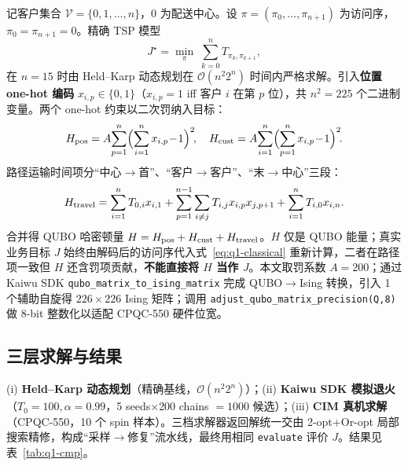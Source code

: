 \documentclass[UTF8,12pt,a4paper]{ctexart}
\begin{document}
记客户集合 $\mathcal{V}=\{0,1,\dots,n\}$，0 为配送中心。设 $\pi=(\pi_0,\dots,\pi_{n+1})$ 为访问序，$\pi_0=\pi_{n+1}=0$。精确 TSP 模型
\begin{equation}
\label{eq:q1-classical}
J^{\star} = \min_{\pi}\; \sum_{k=0}^{n} T_{\pi_k,\pi_{k+1}},
\end{equation}
在 $n=15$ 时由 Held--Karp 动态规划在 $\mathcal{O}(n^{2}2^{n})$ 时间内严格求解。引入\textbf{位置 one-hot 编码} $x_{i,p}\!\in\!\{0,1\}$（$x_{i,p}=1$ iff 客户 $i$ 在第 $p$ 位），共 $n^{2}=225$ 个二进制变量\cite{lucas2014ising,glover2019qubo,warren2017tspqubo}。两个 one-hot 约束以二次罚纳入目标：
\begin{equation}
H_{\rm pos}=A\!\sum_{p=1}^{n}\!\Big(\!\sum_{i=1}^{n} x_{i,p}\!-\!1\Big)^{2}\!,\quad
H_{\rm cust}=A\!\sum_{i=1}^{n}\!\Big(\!\sum_{p=1}^{n} x_{i,p}\!-\!1\Big)^{2}\!.
\label{eq:q1-pos}
\end{equation}
路径运输时间项分``中心$\to$首''、``客户$\to$客户''、``末$\to$中心''三段：
\begin{equation}
\label{eq:q1-travel}
H_{\rm travel}
= \sum_{i=1}^{n} T_{0,i}x_{i,1}
+ \sum_{p=1}^{n-1}\sum_{i\ne j} T_{i,j}x_{i,p}x_{j,p+1}
+ \sum_{i=1}^{n} T_{i,0}x_{i,n}.
\end{equation}
合并得 QUBO 哈密顿量 $H=H_{\rm pos}+H_{\rm cust}+H_{\rm travel}$。$H$ 仅是 QUBO 能量；真实业务目标 $J$ 始终由解码后的访问序代入式~\eqref{eq:q1-classical} 重新计算，二者在路径项一致但 $H$ 还含罚项贡献，\textbf{不能直接将 $H$ 当作 $J$}。本文取罚系数 $A=200$；通过 Kaiwu SDK \texttt{qubo\_matrix\_to\_ising\_matrix}\cite{kadowaki1998qa,kaiwusdk2024} 完成 QUBO$\to$Ising 转换，引入 1 个辅助自旋得 $226\!\times\!226$ Ising 矩阵；调用 \texttt{adjust\_qubo\_matrix\_precision(Q,8)} 做 8-bit 整数化以适配 CPQC-550 硬件位宽。

\subsection{三层求解与结果}
\label{subsec:q1-result}

(i) \textbf{Held--Karp 动态规划}\cite{heldkarp1962dp}（精确基线，$\mathcal{O}(n^{2}2^{n})$）；(ii) \textbf{Kaiwu SDK 模拟退火}\cite{kirkpatrick1983sa}（$T_{0}=100,\alpha=0.99$，5 seeds$\times$200 chains $=1000$ 候选）；(iii) \textbf{CIM 真机求解}（CPQC-550，10 个 spin 样本）。三档求解器返回解统一交由 2-opt\cite{lin1973twoopt}$+$Or-opt\cite{or1976oropt} 局部搜索精修，构成``采样$\to$修复''流水线，最终用相同 \texttt{evaluate} 评价 $J$。结果见表~\ref{tab:q1-cmp}。
\end{document}
